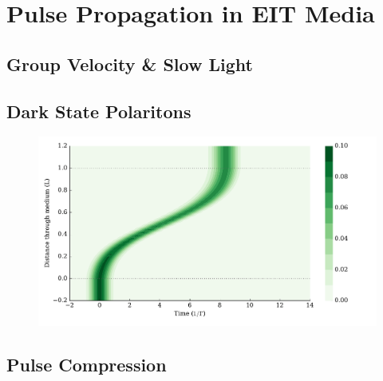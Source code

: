 \section{Pulse Propagation in EIT Media}
  \label{sec:polaritons_propagation}

  \subsection{Group Velocity \& Slow Light}

  \subsection{Dark State Polaritons}

    \begin{figure}[h]
      \includegraphics[width=\linewidth]
        {figs/04_polaritons/pls_p0_2pi_t1_Ng5e3_c10_gaussian_w0_5_2_fig1.pdf}
      \caption{}
      \label{fig:autler_townes}
    \end{figure}

  \subsection{Pulse Compression}